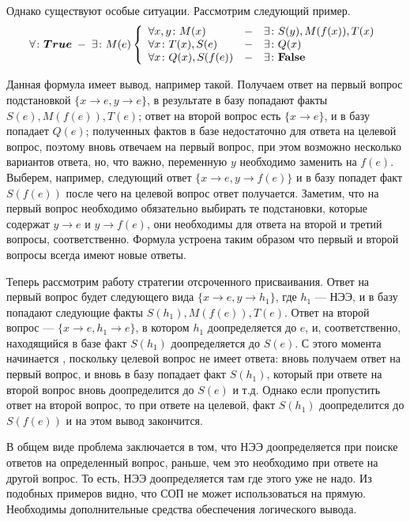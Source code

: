 Однако существуют особые ситуации. Рассмотрим следующий пример.
$$\forall\colon\boldsymbol{True} \; - \; \exists\colon M(e) \left\{
\begin{array}{lcl}
 \forall x,y\colon M(x) & - & \exists\colon S(y),M(f(x)),T(x) \\
 \forall x \colon T(x),S(e) & - & \exists\colon Q(x) \\
 \forall x \colon Q(x),S(f(e)) & - & \exists\colon\textbf{False}
\end{array}
\right.$$

Данная формула имеет вывод, например такой. Получаем ответ на первый вопрос подстановкой $\{ x\rightarrow e, y\rightarrow e \}$, в результате в базу попадают факты $S(e),M(f(e)),T(e)$; ответ на второй вопрос есть $\{ x \rightarrow e\}$, и в базу попадает $Q(e)$; полученных фактов в базе недостаточно для ответа на целевой вопрос, поэтому вновь отвечаем на первый вопрос, при этом возможно несколько вариантов ответа, но, что важно, переменную $y$ необходимо заменить на $f(e)$. Выберем, например, следующий ответ $\{x \rightarrow e, y \rightarrow f(e) \}$ и в базу попадет факт $S(f(e))$ после чего на целевой вопрос ответ получается. Заметим, что на первый вопрос необходимо обязательно выбирать те подстановки, которые содержат $y \rightarrow e$ и $y \rightarrow f(e)$, они необходимы для ответа на второй и третий вопросы, соответственно. Формула устроена таким образом что первый и второй вопросы всегда имеют новые ответы.

Теперь рассмотрим работу стратегии отсроченного присваивания. Ответ на первый вопрос будет следующего вида $\{ x\rightarrow e, y\rightarrow h_1 \}$, где $h_1$ --- НЭЭ, и в базу попадают следующие факты $S(h_1),M(f(e)),T(e)$. Ответ на второй вопрос --- $\{ x\rightarrow e, h_1\rightarrow e \}$, в котором $h_1$ доопределяется до $e$, и, соответственно, находящийся в базе факт $S(h_1)$ доопределяется до $S(e)$. С этого момента начинается , поскольку целевой вопрос не имеет ответа: вновь получаем ответ на первый вопрос, и вновь в базу попадает факт $S(h_1)$, который при ответе на второй вопрос вновь доопределится до $S(e)$ и т.д. Однако если пропустить ответ на второй вопрос, то при ответе на целевой, факт $S(h_1)$ доопределится до $S(f(e))$ и на этом вывод закончится.

В общем виде проблема заключается в том, что НЭЭ доопределяется при поиске ответов на определенный вопрос, раньше, чем это необходимо при ответе на другой вопрос. То есть, НЭЭ доопределяется там где этого уже не надо. Из подобных примеров видно, что СОП не может использоваться на прямую. Необходимы дополнительные средства обеспечения логического вывода. 

